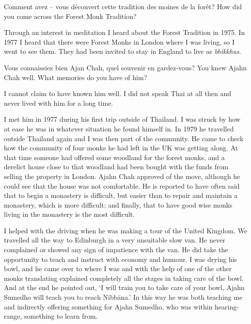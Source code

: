 
\questionBi%
{Comment avez -- vous découvert cette tradition des moines de la forêt?}%
{How did you come across the Forest Monk Tradition?}

\answer{}
Through an interest in meditation I heard about the Forest Tradition
in 1975. In 1977 I heard that there were Forest Monks in London where I
was living, so I went to see them. They had been invited to stay in
England to live as \emph{bhikkhus}.

\questionBi%
{Vous connaissiez bien Ajan Chah, quel souvenir en gardez-vous?}%
{You knew Ajahn Chah well. What memories do you have of him?}

\answer{}
I cannot claim to have known him well. I did not speak Thai at
all then and never lived with him for a long time.

I met him in 1977 during his first trip outside of Thailand. I was
struck by how at ease he was in whatever situation he found himself in. 
In 1979 he travelled outside Thailand again and I was then part of the
community. He came to check how the community of four monks he had left
in the UK was getting along. At that time someone had offered some
woodland for the forest monks, and a derelict house close to that
woodland had been bought with the funds from selling the property in
London. Ajahn Chah approved of the move, although he could see that the
house was not comfortable. He is reported to have often said that to
begin a monastery is difficult, but easier than to repair and maintain a
monastery, which is more difficult; and finally, that to have good wise
monks living in the monastery is the most difficult. 

I helped with the driving when he was making a tour of the United
Kingdom. We travelled all the way to Edinburgh in a very unsuitable slow
van. He never complained or showed any sign of impatience with the van. 
He did take the opportunity to teach and instruct with economy and
humour. I was drying his bowl, and he came over to where I was and with
the help of one of the other monks translating explained completely all
the stages in taking care of the bowl. And at the end he pointed out, `I
will train you to take care of your bowl, Ajahn Sumedho will teach you
to reach Nibbāna.' In this way he was both teaching me and indirectly
offering something for Ajahn Sumedho, who was within hearing-range, 
something to learn from. 

